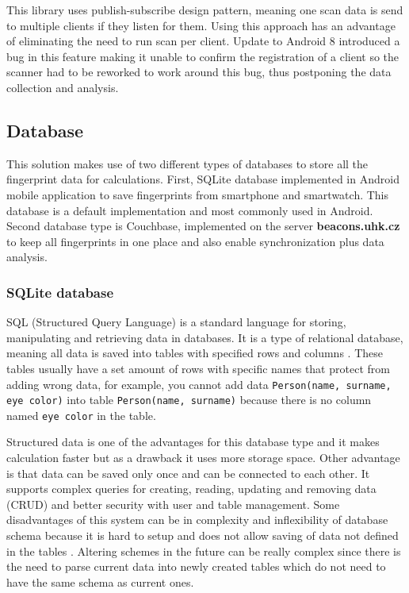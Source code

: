 This library uses publish-subscribe design pattern, meaning one scan data is send to multiple clients if they listen for them. Using this approach has an advantage of eliminating the need to run scan per client. Update to Android 8 introduced a bug in this feature making it unable to confirm the registration of a client so the scanner had to be reworked to work around this bug, thus postponing the data collection and analysis.

\subsection{Database}\label{subsec:Database}
This solution makes use of two different types of databases to store all the fingerprint data for calculations. First, SQLite database implemented in Android mobile application to save fingerprints from smartphone and smartwatch. This database is a default implementation and most commonly used in Android. Second database type is Couchbase, implemented on the server \textbf{beacons.uhk.cz} to keep all fingerprints in one place and also enable synchronization plus data analysis.

\subsubsection{SQLite database}\label{subsec:SQLiteDatabase}
SQL (Structured Query Language) is a standard language for storing, manipulating and retrieving data in databases. It is a type of relational database, meaning all data is saved into tables with specified rows and columns \cite{WISQLITE}. These tables usually have a set amount of rows with specific names that protect from adding wrong data, for example, you cannot add data \verb|Person(name, surname, eye color)| into table \verb|Person(name, surname)| because there is no column named \verb|eye color| in the table.

Structured data is one of the advantages for this database type and it makes calculation faster but as a drawback it uses more storage space. Other advantage is that data can be saved only once and can be connected to each other. It supports complex queries for creating, reading, updating and removing data (CRUD) and better security with user and table management. Some disadvantages of this system can be in complexity and inflexibility of database schema because it is hard to setup and does not allow saving of data not defined in the tables \cite{ERDMS}. Altering schemes in the future can be really complex since there is the need to parse current data into newly created tables which do not need to have the same schema as current ones.

